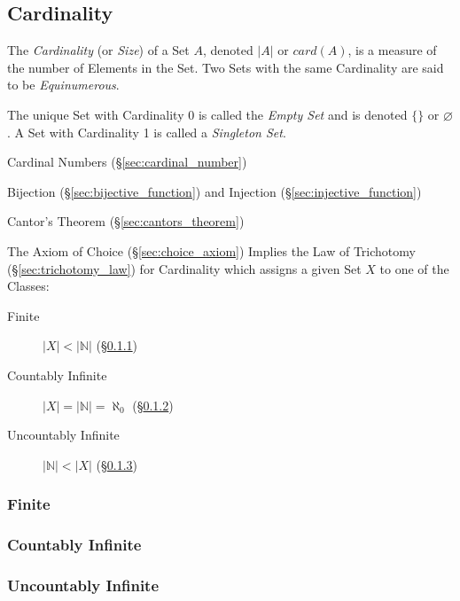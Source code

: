 \subsection{Cardinality}\label{sec:cardinality}

The \emph{Cardinality} (or \emph{Size}) of a Set $A$, denoted $|A|$ or
$card(A)$, is a measure of the number of Elements in the Set. Two Sets
with the same Cardinality are said to be \emph{Equinumerous}.

The unique Set with Cardinality 0 is called the \emph{Empty Set} and
is denoted $\{\}$ or $\varnothing$. A Set with Cardinality 1 is called a
\emph{Singleton Set}.

Cardinal Numbers (\S\ref{sec:cardinal_number})

Bijection (\S\ref{sec:bijective_function}) and Injection
(\S\ref{sec:injective_function})

Cantor's Theorem (\S\ref{sec:cantors_theorem})

The Axiom of Choice (\S\ref{sec:choice_axiom}) Implies the Law of
Trichotomy (\S\ref{sec:trichotomy_law}) for Cardinality which assigns
a given Set $X$ to one of the Classes:

\begin{description}
\item [Finite] $|X| < |\mathbb{N}|$ (\S\ref{sec:finite})
\item [Countably Infinite] $|X| = |\mathbb{N}| = \aleph_0$
  (\S\ref{sec:countably_infinite})
\item [Uncountably Infinite] $|\mathbb{N}| < |X|$
  (\S\ref{sec:uncountably_infinite})
\end{description}



\subsubsection{Finite}\label{sec:finite}

\subsubsection{Countably Infinite}\label{sec:countably_infinite}

\subsubsection{Uncountably Infinite}\label{sec:uncountably_infinite}

